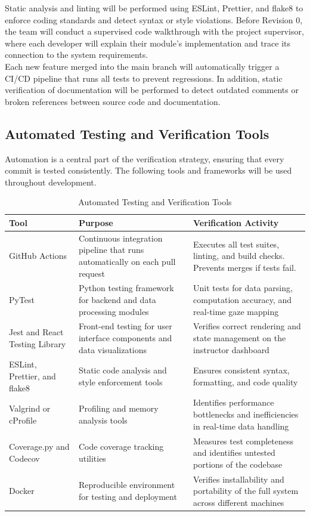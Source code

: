 \documentclass[12pt, titlepage]{article}
\begin{document}
Static analysis and linting will be performed using ESLint, Prettier, and flake8 to enforce coding standards and detect syntax or style violations. Before Revision 0, the team will conduct a supervised code walkthrough with the project supervisor, where each developer will explain their module’s implementation and trace its connection to the system requirements.\\

Each new feature merged into the main branch will automatically trigger a CI/CD pipeline that runs all tests to prevent regressions. In addition, static verification of documentation will be performed to detect outdated comments or broken references between source code and documentation.\\

\subsection{Automated Testing and Verification Tools}

Automation is a central part of the verification strategy, ensuring that every commit is tested consistently. The following tools and frameworks will be used throughout development.\\

\begin{table}[htbp]
\centering
\caption{Automated Testing and Verification Tools}
\begin{tabularx}{\textwidth}{|p{3cm}|p{4cm}|X|}
\hline
\textbf{Tool} & \textbf{Purpose} & \textbf{Verification Activity} \\
\hline
GitHub Actions & Continuous integration pipeline that runs automatically on each pull request & Executes all test suites, linting, and build checks. Prevents merges if tests fail. \\
\hline
PyTest & Python testing framework for backend and data processing modules & Unit tests for data parsing, computation accuracy, and real-time gaze mapping \\
\hline
Jest and React Testing Library & Front-end testing for user interface components and data visualizations & Verifies correct rendering and state management on the instructor dashboard \\
\hline
ESLint, Prettier, and flake8 & Static code analysis and style enforcement tools & Ensures consistent syntax, formatting, and code quality \\
\hline
Valgrind or cProfile & Profiling and memory analysis tools & Identifies performance bottlenecks and inefficiencies in real-time data handling \\
\hline
Coverage.py and Codecov & Code coverage tracking utilities & Measures test completeness and identifies untested portions of the codebase \\
\hline
Docker & Reproducible environment for testing and deployment & Verifies installability and portability of the full system across different machines \\
\hline
\end{tabularx}
\end{table}
\end{document}
